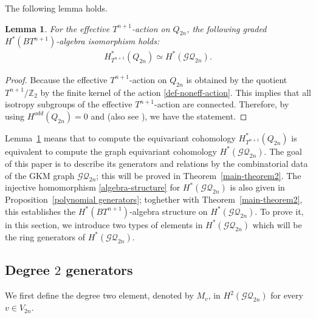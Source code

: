 \documentclass[12pt]{amsart}
\newtheorem{lemma}[theorem]{Lemma}
\theoremstyle{remark}
\numberwithin{equation}{section}
\begin{document}
The following lemma holds.
\begin{lemma}
\label{key-lemma}
For the effective $T^{n+1}$-action on $Q_{2n}$, the following graded $H^{*}(BT^{n+1})$-algebra isomorphism holds:
\begin{align*}
H_{T^{n+1}}^{*}(Q_{2n})\simeq H^{*}(\mathcal{GQ}_{2n}).
\end{align*}
\end{lemma}
\begin{proof}
Because the effective $T^{n+1}$-action on $Q_{2n}$ is obtained by the quotient $T^{n+1}/\mathbb{Z}_{2}$ by the finite kernel of the action \eqref{def-noneff-action}.
This implies that all isotropy subgroups of the effective $T^{n+1}$-action are connected. 
Therefore, by using $H^{odd}(Q_{2n})=0$ and \cite{FP07} (also see \cite[Theorem 2.12]{DKS}), we have the statement. 
\end{proof}
Lemma~\ref{key-lemma} means that to compute the equivariant cohomology $H_{T^{n+1}}^{*}(Q_{2n})$ is equivalent to compute the graph equivariant cohomology $H^{*}(\mathcal{GQ}_{2n})$.
The goal of this paper is to describe its generators and relations 
by the combinatorial data of the GKM graph $\mathcal{GQ}_{2n}$; this will be proved in Theorem~\ref{main-theorem2}.
The injective homomorphism \eqref{algebra-structure} for $H^{*}(\mathcal{GQ}_{2n})$ is also given in Proposition~\ref{polynomial generators}; toghether with Theorem~\ref{main-theorem2}, this establishes the $H^{*}(BT^{n+1})$-algebra structure on $H^{*}(\mathcal{GQ}_{2n})$.
To prove it, 
in this section, we introduce two types of elements in $H^{*}(\mathcal{GQ}_{2n})$ which will be the ring generators of $H^{*}(\mathcal{GQ}_{2n})$.

\subsection{Degree $2$ generators}
\label{sect:3.1}

We first define the degree two element, denoted by $M_{v}$, in $H^{2}(\mathcal{GQ}_{2n})$ for every $v\in V_{2n}$.
\end{document}
